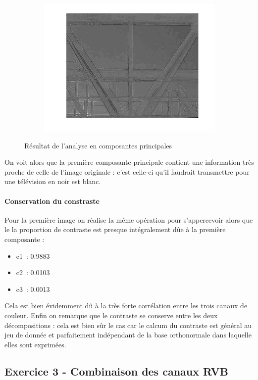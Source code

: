 \documentclass{article}
\begin{document}
\begin{figure}[!ht]
\begin{subfigure}[c]{0.32\linewidth}
        \includegraphics[width=\linewidth]{images/1-gantrycrane_c3.png}
    \end{subfigure}
    \caption{Résultat de l'analyse en composantes principales}
    \label{acp_gantrycrane}
\end{figure}
On voit alors que la première composante principale contient une information très proche de celle de l'image originale : c'est celle-ci qu'il faudrait transmettre pour une télévision en noir est blanc.
\paragraph{Conservation du constraste}
Pour la première image on réalise la même opération pour s'appercevoir alors que le la proportion de contraste est presque intégralement dûe à la première composante :
\begin{itemize}
    \item c1~: 0.9883
    \item c2~: 0.0103
    \item c3~: 0.0013
\end{itemize}
Cela est bien évidemment dû à la très forte corrélation entre les trois canaux de couleur. Enfin on remarque que le contraste se conserve entre les deux décompositions : cela est bien sûr le cas car le calcum du contraste est général au jeu de donnée et parfaitement indépendant de la base orthonormale dans laquelle elles sont exprimées.

\subsection{Exercice 3 - Combinaison des canaux RVB}
\end{document}
